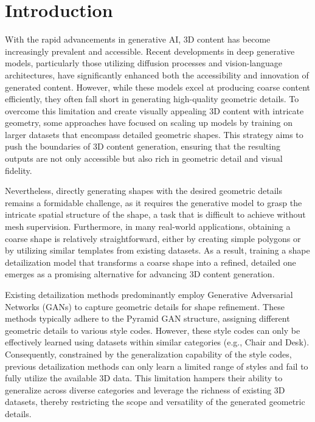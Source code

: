 \section{Introduction}
With the rapid advancements in generative AI, 3D content has become increasingly prevalent and accessible. Recent developments in deep generative models, particularly those utilizing diffusion processes and vision-language architectures, have significantly enhanced both the accessibility and innovation of generated content. However, while these models excel at producing coarse content efficiently, they often fall short in generating high-quality geometric details. To overcome this limitation and create visually appealing 3D content with intricate geometry, some approaches have focused on scaling up models by training on larger datasets that encompass detailed geometric shapes. This strategy aims to push the boundaries of 3D content generation, ensuring that the resulting outputs are not only accessible but also rich in geometric detail and visual fidelity.

Nevertheless, directly generating shapes with the desired geometric details remains a formidable challenge, as it requires the generative model to grasp the intricate spatial structure of the shape, a task that is difficult to achieve without mesh supervision. Furthermore, in many real-world applications, obtaining a coarse shape is relatively straightforward, either by creating simple polygons or by utilizing similar templates from existing datasets. As a result, training a shape detailization model that transforms a coarse shape into a refined, detailed one emerges as a promising alternative for advancing 3D content generation.

Existing detailization methods predominantly employ Generative Adversarial Networks (GANs) to capture geometric details for shape refinement. These methods typically adhere to the Pyramid GAN structure, assigning different geometric details to various style codes. However, these style codes can only be effectively learned using datasets within similar categories (e.g., Chair and Desk). Consequently, constrained by the generalization capability of the style codes, previous detailization methods can only learn a limited range of styles and fail to fully utilize the available 3D data. This limitation hampers their ability to generalize across diverse categories and leverage the richness of existing 3D datasets, thereby restricting the scope and versatility of the generated geometric details.

